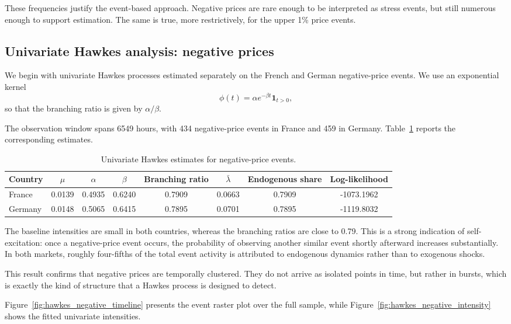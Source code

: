 These frequencies justify the event-based approach. Negative prices are rare enough to be interpreted as stress events, but still numerous enough to support estimation. The same is true, more restrictively, for the upper 1\% price events.

\subsection{Univariate Hawkes analysis: negative prices}

We begin with univariate Hawkes processes estimated separately on the French and German negative-price events. We use an exponential kernel
\[
\phi(t) = \alpha e^{-\beta t}\mathbf{1}_{t>0},
\]
so that the branching ratio is given by \(\alpha/\beta\).

The observation window spans 6549 hours, with 434 negative-price events in France and 459 in Germany. Table~\ref{tab:hawkes_uni_negative} reports the corresponding estimates.

\begin{table}[H]
\centering
\caption{Univariate Hawkes estimates for negative-price events.}
\label{tab:hawkes_uni_negative}
\begin{tabular}{lccccccc}
\toprule
Country & \(\mu\) & \(\alpha\) & \(\beta\) & Branching ratio & \(\bar{\lambda}\) & Endogenous share & Log-likelihood \\
\midrule
France   & 0.0139 & 0.4935 & 0.6240 & 0.7909 & 0.0663 & 0.7909 & -1073.1962 \\
Germany  & 0.0148 & 0.5065 & 0.6415 & 0.7895 & 0.0701 & 0.7895 & -1119.8032 \\
\bottomrule
\end{tabular}
\end{table}

The baseline intensities are small in both countries, whereas the branching ratios are close to 0.79. This is a strong indication of self-excitation: once a negative-price event occurs, the probability of observing another similar event shortly afterward increases substantially. In both markets, roughly four-fifths of the total event activity is attributed to endogenous dynamics rather than to exogenous shocks.

This result confirms that negative prices are temporally clustered. They do not arrive as isolated points in time, but rather in bursts, which is exactly the kind of structure that a Hawkes process is designed to detect.

Figure~\ref{fig:hawkes_negative_timeline} presents the event raster plot over the full sample, while Figure~\ref{fig:hawkes_negative_intensity} shows the fitted univariate intensities.

